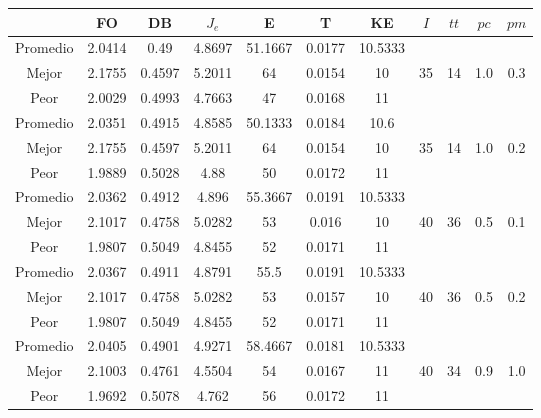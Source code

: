 \begin{table}[h!]
    \footnotesize
    \begin{center}
        \begin{tabular}{|c|c|c|c|c|c|c|c|c|c|c|}
        \hline
             & {\bf FO} & {\bf DB} & $J_e$ & {\bf E} & {\bf T} & {\bf KE} & $I$ & $tt$ & $pc$ & $pm$ \\
        \hline
        \hline
            Promedio  & 2.0414 & 0.49 & 4.8697 & 51.1667 & 0.0177 & 10.5333 &  &  &  & \\
            \cline{1-7}
            Mejor & 2.1755 & 0.4597  & 5.2011 & 64 & 0.0154 & 10 & 35 & 14 & 1.0 & 0.3\\
            \cline{1-7}
            Peor & 2.0029 & 0.4993  & 4.7663 & 47 & 0.0168 & 11 &  &  &  & \\
        \hline
        \hline
            Promedio  & 2.0351 & 0.4915 & 4.8585 & 50.1333 & 0.0184 & 10.6 &  &  &  & \\
            \cline{1-7}
            Mejor & 2.1755 & 0.4597  & 5.2011 & 64 & 0.0154 & 10 & 35 & 14 & 1.0 & 0.2\\
            \cline{1-7}
            Peor & 1.9889 & 0.5028  & 4.88 & 50 & 0.0172 & 11 &  &  &  & \\
        \hline
        \hline
            Promedio  & 2.0362 & 0.4912 & 4.896 & 55.3667 & 0.0191 & 10.5333 &  &  &  & \\
            \cline{1-7}
            Mejor & 2.1017 & 0.4758  & 5.0282 & 53 & 0.016 & 10 & 40 & 36 & 0.5 & 0.1\\
            \cline{1-7}
            Peor & 1.9807 & 0.5049  & 4.8455 & 52 & 0.0171 & 11 &  &  &  & \\
        \hline
        \hline
            Promedio  & 2.0367 & 0.4911 & 4.8791 & 55.5 & 0.0191 & 10.5333 &  &  &  & \\
            \cline{1-7}
            Mejor & 2.1017 & 0.4758  & 5.0282 & 53 & 0.0157 & 10 & 40 & 36 & 0.5 & 0.2\\
            \cline{1-7}
            Peor & 1.9807 & 0.5049  & 4.8455 & 52 & 0.0171 & 11 &  &  &  & \\
        \hline
        \hline
            Promedio  & 2.0405 & 0.4901 & 4.9271 & 58.4667 & 0.0181 & 10.5333 &  &  &  & \\
            \cline{1-7}
            Mejor & 2.1003 & 0.4761  & 4.5504 & 54 & 0.0167 & 11 & 40 & 34 & 0.9 & 1.0\\
            \cline{1-7}
            Peor & 1.9692 & 0.5078  & 4.762 & 56 & 0.0172 & 11 &  &  &  & \\

\end{tabular}
\end{center}
\end{table}
